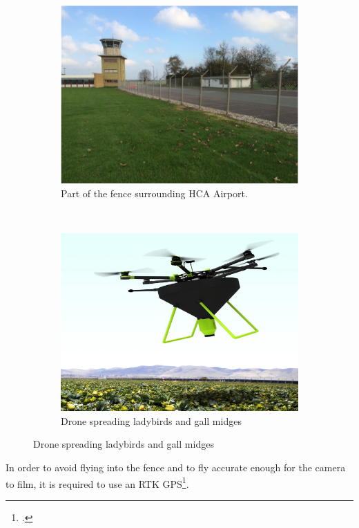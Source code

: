 \begin{figure}[H]
    \centering
    \begin{subfigure}[b]{0.45\textwidth}
        \includegraphics[width=\textwidth]{graphics/hca_fence.png}
        \caption{Part of the fence surrounding HCA Airport.}
        \label{fig:hca_fence}
    \end{subfigure}
        ~  %
    \begin{subfigure}[b]{0.45\textwidth}
        \includegraphics[width=\textwidth]{graphics/organicdrone.png}
        \caption{Drone spreading ladybirds and gall midges}
        \label{fig:organicdrone}
    \end{subfigure}
   \label{fig:sdu_projects}
\end{figure}
In order to avoid flying into the fence and to fly accurate enough for the camera to film, it is required to use an RTK GPS\footcite{2_gakstatter_2014}.

